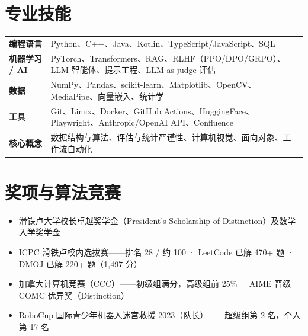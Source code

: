 \documentclass[a4paper,11pt]{article}
\newenvironment{bullets}
  {\begin{itemize}[leftmargin=1.5em,labelsep=0.5em,itemsep=1.5pt,topsep=1.5pt,parsep=0pt,partopsep=0pt]\small}
  {\end{itemize}\vspace{1pt}}
\begin{document}
\section{专业技能}
\begin{tabularx}{\textwidth}{@{}l X@{}}
  \textbf{编程语言} & Python、C++、Java、Kotlin、TypeScript/JavaScript、SQL\\
  \textbf{机器学习 / AI} & PyTorch、Transformers、RAG、RLHF（PPO/DPO/GRPO）、LLM 智能体、提示工程、LLM-as-judge 评估\\
  \textbf{数据} & NumPy、Pandas、scikit-learn、Matplotlib、OpenCV、MediaPipe、向量嵌入、统计学\\
  \textbf{工具} & Git、Linux、Docker、GitHub Actions、HuggingFace、Playwright、Anthropic/OpenAI API、Confluence\\
  \textbf{核心概念} & 数据结构与算法、评估与统计严谨性、计算机视觉、面向对象、工作流自动化\\
\end{tabularx}

\section{奖项与算法竞赛}
\begin{bullets}
  \item 滑铁卢大学校长卓越奖学金（President's Scholarship of Distinction）及数学入学奖学金
  \item ICPC 滑铁卢校内选拔赛——排名 28 / 约 100 · LeetCode 已解 470+ 题 · DMOJ 已解 220+ 题（1{,}497 分）
  \item 加拿大计算机竞赛（CCC）——初级组满分，高级组前 25\% · AIME 晋级 · COMC 优异奖（Distinction）
  \item RoboCup 国际青少年机器人迷宫救援 2023（队长）——超级组第 2 名，个人第 17 名
\end{bullets}
\end{document}
